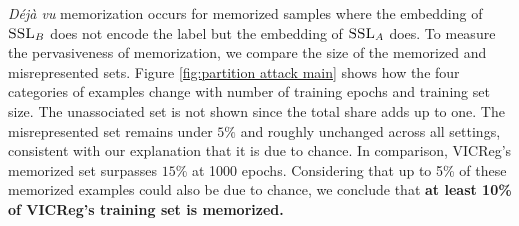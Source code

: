 \emph{Déjà vu} memorization occurs for {\color{part_orange}memorized} samples where the embedding of $\textsc{SSL}_B$ does not encode the label but the embedding of $\textsc{SSL}_A$ does. To measure the pervasiveness of \dejavu memorization, we compare the size of the {\color{part_orange}memorized} and {\color{part_red}misrepresented} sets.
Figure \ref{fig:partition attack main} shows how the four categories of examples change with number of training epochs and training set size. The {\color{gray}unassociated} set is not shown since the total share adds up to one. The {\color{part_red}misrepresented} set remains under $5\%$ and roughly unchanged across all settings, consistent with our explanation that it is due to chance. In comparison, VICReg's {\color{part_orange}memorized} set surpasses $15\%$ at 1000 epochs. Considering that up to 5\% of these memorized examples could also be due to chance, we conclude that \textbf{at least 10\% of VICReg's training set is \dejavu memorized.} 

